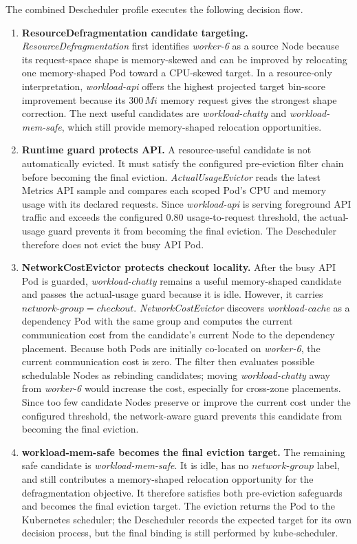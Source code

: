The combined Descheduler profile executes the following decision flow.

\begin{enumerate}
    \item \textbf{ResourceDefragmentation candidate targeting.}
    \textit{ResourceDefragmentation} first identifies \textit{worker-6} as a source Node because its request-space shape is memory-skewed and can be improved by relocating one memory-shaped Pod toward a CPU-skewed target. In a resource-only interpretation, \textit{workload-api} offers the highest projected target bin-score improvement because its $300\,Mi$ memory request gives the strongest shape correction. The next useful candidates are \textit{workload-chatty} and \textit{workload-mem-safe}, which still provide memory-shaped relocation opportunities.

    \item \textbf{Runtime guard protects API.}
    A resource-useful candidate is not automatically evicted. It must satisfy the configured pre-eviction filter chain before becoming the final eviction. \textit{ActualUsageEvictor} reads the latest Metrics API sample and compares each scoped Pod's CPU and memory usage with its declared requests. Since \textit{workload-api} is serving foreground API traffic and exceeds the configured $0.80$ usage-to-request threshold, the actual-usage guard prevents it from becoming the final eviction. The Descheduler therefore does not evict the busy API Pod.

    \item \textbf{NetworkCostEvictor protects checkout locality.}
    After the busy API Pod is guarded, \textit{workload-chatty} remains a useful memory-shaped candidate and passes the actual-usage guard because it is idle. However, it carries $network\mbox{-}group=checkout$. \textit{NetworkCostEvictor} discovers \textit{workload-cache} as a dependency Pod with the same group and computes the current communication cost from the candidate's current Node to the dependency placement. Because both Pods are initially co-located on \textit{worker-6}, the current communication cost is zero. The filter then evaluates possible schedulable Nodes as rebinding candidates; moving \textit{workload-chatty} away from \textit{worker-6} would increase the cost, especially for cross-zone placements. Since too few candidate Nodes preserve or improve the current cost under the configured threshold, the network-aware guard prevents this candidate from becoming the final eviction.

    \item \textbf{workload-mem-safe becomes the final eviction target.}
    The remaining safe candidate is \textit{workload-mem-safe}. It is idle, has no $network\mbox{-}group$ label, and still contributes a memory-shaped relocation opportunity for the defragmentation objective. It therefore satisfies both pre-eviction safeguards and becomes the final eviction target. The eviction returns the Pod to the Kubernetes scheduler; the Descheduler records the expected target for its own decision process, but the final binding is still performed by kube-scheduler.
\end{enumerate}

